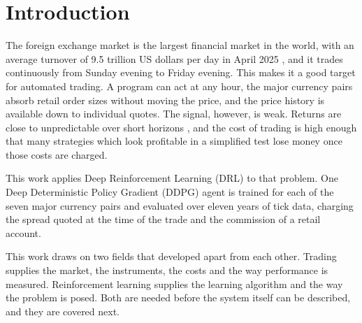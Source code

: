 \section{Introduction}
\label{Section:Introduction}

The foreign exchange market is the largest financial market in the world, with an average turnover of 9.5 trillion US dollars per day in April 2025 \cite{bis_otc_2025}, and it trades continuously from Sunday evening to Friday evening. This makes it a good target for automated trading. A program can act at any hour, the major currency pairs absorb retail order sizes without moving the price, and the price history is available down to individual quotes. The signal, however, is weak. Returns are close to unpredictable over short horizons \cite{fama_efficient_1970}, and the cost of trading is high enough that many strategies which look profitable in a simplified test lose money once those costs are charged.

This work applies Deep Reinforcement Learning (DRL) to that problem. One Deep Deterministic Policy Gradient (DDPG) \cite{lillicrap_continuous_2015} agent is trained for each of the seven major currency pairs and evaluated over eleven years of tick data, charging the spread quoted at the time of the trade and the commission of a retail account.











This work draws on two fields that developed apart from each other. Trading supplies the market, the instruments, the costs and the way performance is measured. Reinforcement learning supplies the learning algorithm and the way the problem is posed. Both are needed before the system itself can be described, and they are covered next.